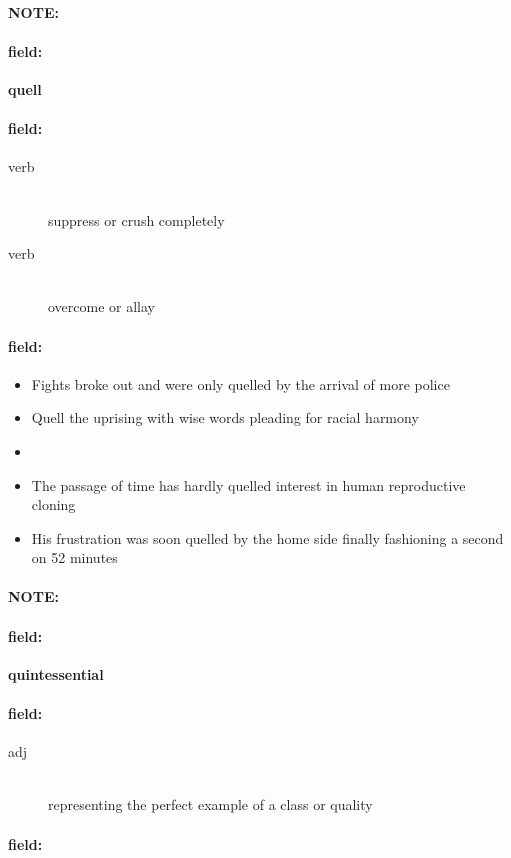 \documentclass[12pt]{article}
\newenvironment{note}{\paragraph{NOTE:}}{}
\newenvironment{field}{\paragraph{field:}}{}
\begin{document}
\begin{note}
\begin{field}
\textbf{\large quell}
\end{field}


\begin{field}
\begin{description}
\item[verb] \hfill \\ 
suppress or crush completely

\item[verb] \hfill \\ 
overcome or allay

\end{description}
\end{field}

\begin{field}
\begin{itemize}
\item Fights broke out and were only quelled by the arrival of more police
\item Quell the uprising with wise words pleading for racial harmony
\item 
\item The passage of time has hardly quelled interest in human reproductive cloning
\item His frustration was soon quelled by the home side finally fashioning a second on 52 minutes
\end{itemize}
\end{field}
\end{note}
\begin{note}
\begin{field}
\textbf{\large quintessential}
\end{field}


\begin{field}
\begin{description}
\item[adj] \hfill \\ 
representing the perfect example of a class or quality

\end{description}
\end{field}

\begin{field}
\end{field}
\end{note}
\end{document}
